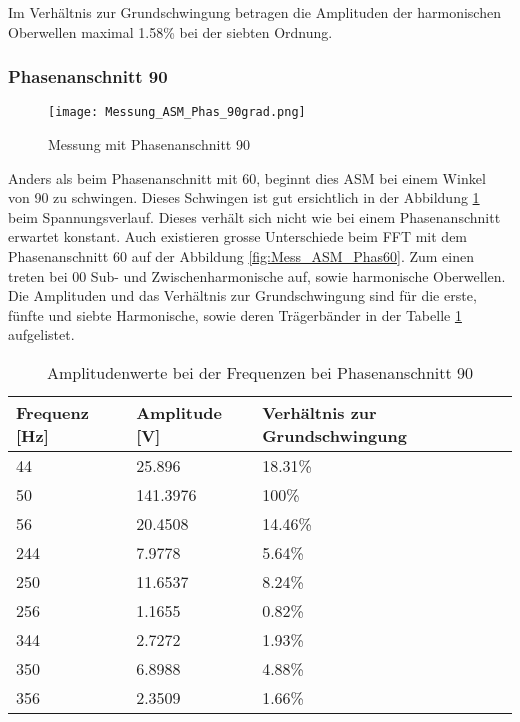 Im Verhältnis zur Grundschwingung betragen die Amplituden der harmonischen Oberwellen maximal 1.58\% bei der siebten Ordnung. 

\newpage
\subsubsection*{Phasenanschnitt 90\textdegree}
\begin{figure}[ht!]
	\centering
	\texttt{[image: Messung\_ASM\_Phas\_90grad.png]}	
	\caption{Messung mit Phasenanschnitt 90\textdegree}\label{fig:Mess_ASM_Phas90}
\end{figure}

Anders als beim Phasenanschnitt mit 60\textdegree, beginnt dies ASM bei einem Winkel von 90\textdegree \hspace{0.02cm} zu schwingen. Dieses Schwingen ist gut ersichtlich in der Abbildung \ref{fig:Mess_ASM_Phas90} beim Spannungsverlauf. Dieses verhält sich nicht wie bei einem Phasenanschnitt erwartet konstant. Auch existieren grosse Unterschiede beim FFT mit dem Phasenanschnitt 60\textdegree \hspace{0.02cm} auf der Abbildung \ref{fig:Mess_ASM_Phas60}. Zum einen treten bei 00\textdegree \hspace{0.02cm} Sub- und Zwischenharmonische auf, sowie harmonische Oberwellen. Die Amplituden und das Verhältnis zur Grundschwingung sind für die erste, fünfte und siebte Harmonische, sowie deren Trägerbänder in der Tabelle \ref{tab:Mess_Spannung_ASM_Phas90} aufgelistet. 

\begin{table}[ht!]
	\centering
	\begin{tabular}{|l|l|l|}
		\hline
		Frequenz {[}Hz{]} & Amplitude {[}V{]} & Verhältnis zur Grundschwingung \\ \hline
		44                & 25.896            & 18.31\%                        \\ \hline
		50                & 141.3976          & 100\%                          \\ \hline
		56                & 20.4508           & 14.46\%                        \\ \hline
		244               & 7.9778            & 5.64\%                         \\ \hline
		250               & 11.6537           & 8.24\%                         \\ \hline
		256               & 1.1655            & 0.82\%                         \\ \hline
		344               & 2.7272            & 1.93\%                         \\ \hline
		350               & 6.8988            & 4.88\%                         \\ \hline
		356               & 2.3509            & 1.66\%                         \\ \hline
	\end{tabular}
\caption{Amplitudenwerte bei der Frequenzen bei Phasenanschnitt 90\textdegree}\label{tab:Mess_Spannung_ASM_Phas90}
\end{table}

